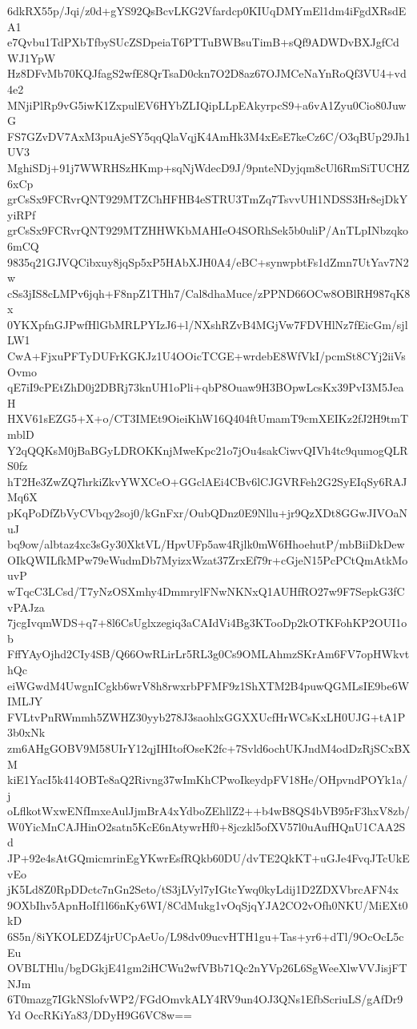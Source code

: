 6dkRX55p/Jqi/z0d+gYS92QsBcvLKG2Vfardcp0KIUqDMYmEl1dm4iFgdXRsdEA1
e7Qvbu1TdPXbTfbySUcZSDpeiaT6PTTuBWBsuTimB+sQf9ADWDvBXJgfCdWJ1YpW
Hz8DFvMb70KQJfagS2wfE8QrTsaD0ckn7O2D8az67OJMCeNaYnRoQf3VU4+vd4e2
MNjiPlRp9vG5iwK1ZxpulEV6HYbZLIQipLLpEAkyrpcS9+a6vA1Zyu0Cio80JuwG
FS7GZvDV7AxM3puAjeSY5qqQlaVqjK4AmHk3M4xEsE7keCz6C/O3qBUp29Jh1UV3
MghiSDj+91j7WWRHSzHKmp+sqNjWdecD9J/9pnteNDyjqm8cUl6RmSiTUCHZ6xCp
grCsSx9FCRvrQNT929MTZChHFHB4eSTRU3TmZq7TsvvUH1NDSS3Hr8ejDkYyiRPf
grCsSx9FCRvrQNT929MTZHHWKbMAHIeO4SORhSek5b0uliP/AnTLpINbzqko6mCQ
9835q21GJVQCibxuy8jqSp5xP5HAbXJH0A4/eBC+synwpbtFs1dZmn7UtYav7N2w
cSs3jIS8cLMPv6jqh+F8npZ1THh7/Cal8dhaMuce/zPPND66OCw8OBlRH987qK8x
0YKXpfnGJPwfHlGbMRLPYIzJ6+l/NXshRZvB4MGjVw7FDVHlNz7fEicGm/sjlLW1
CwA+FjxuPFTyDUFrKGKJz1U4OOicTCGE+wrdebE8WfVkI/pcmSt8CYj2iiVsOvmo
qE7iI9cPEtZhD0j2DBRj73knUH1oPli+qbP8Ouaw9H3BOpwLcsKx39PvI3M5JeaH
HXV61sEZG5+X+o/CT3IMEt9OieiKhW16Q404ftUmamT9cmXEIKz2fJ2H9tmTmblD
Y2qQQKsM0jBaBGyLDROKKnjMweKpc21o7jOu4sakCiwvQIVh4tc9qumogQLRS0fz
hT2He3ZwZQ7hrkiZkvYWXCeO+GGclAEi4CBv6lCJGVRFeh2G2SyEIqSy6RAJMq6X
pKqPoDfZbVyCVbqy2soj0/kGnFxr/OubQDnz0E9Nllu+jr9QzXDt8GGwJIVOaNuJ
bq9ow/albtaz4xc3sGy30XktVL/HpvUFp5aw4Rjlk0mW6HhoehutP/mbBiiDkDew
OIkQWILfkMPw79eWudmDb7MyizxWzat37ZrxEf79r+cGjeN15PcPCtQmAtkMouvP
wTqcC3LCsd/T7yNzOSXmhy4DmmrylFNwNKNxQ1AUHfRO27w9F7SepkG3fCvPAJza
7jcgIvqmWDS+q7+8l6CsUglxzegiq3aCAIdVi4Bg3KTooDp2kOTKFohKP2OUI1ob
FffYAyOjhd2CIy4SB/Q66OwRLirLr5RL3g0Cs9OMLAhmzSKrAm6FV7opHWkvthQc
eiWGwdM4UwgnICgkb6wrV8h8rwxrbPFMF9z1ShXTM2B4puwQGMLsIE9be6WIMLJY
FVLtvPnRWmmh5ZWHZ30yyb278J3saohlxGGXXUcfHrWCsKxLH0UJG+tA1P3b0xNk
zm6AHgGOBV9M58UIrY12qjIHItofOseK2fc+7Svld6ochUKJndM4odDzRjSCxBXM
kiE1YacI5k414OBTe8aQ2Rivng37wImKhCPwoIkeydpFV18He/OHpvndPOYk1a/j
oLflkotWxwENfImxeAulJjmBrA4xYdboZEhllZ2++b4wB8QS4bVB95rF3hxV8zb/
W0YicMnCAJHinO2satn5KcE6nAtywrHf0+8jczkl5ofXV57l0uAufHQnU1CAA2Sd
JP+92e4sAtGQmicmrinEgYKwrEsfRQkb60DU/dvTE2QkKT+uGJe4FvqJTcUkEvEo
jK5Ld8Z0RpDDctc7nGn2Seto/tS3jLVyl7yIGtcYwq0kyLdij1D2ZDXVbrcAFN4x
9OXbIhv5ApnHoIf1l66nKy6WI/8CdMukg1vOqSjqYJA2CO2vOfh0NKU/MiEXt0kD
6S5n/8iYKOLEDZ4jrUCpAeUo/L98dv09ucvHTH1gu+Tas+yr6+dTl/9OcOcL5cEu
OVBLTHlu/bgDGkjE41gm2iHCWu2wfVBb71Qc2nYVp26L6SgWeeXlwVVJisjFTNJm
6T0mazg7IGkNSlofvWP2/FGdOmvkALY4RV9un4OJ3QNs1EfbScriuLS/gAfDr9Yd
OccRKiYa83/DDyH9G6VC8w==
